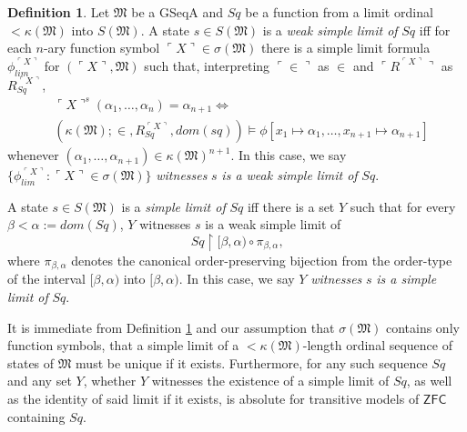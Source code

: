 \documentclass[12pt, twoside]{memoir}
\numberwithin{equation}{section}
\theoremstyle{definition}
\newtheorem{defi}[thm]{Definition}
\theoremstyle{remark}
\theoremstyle{definition}
\theoremstyle{definition}
\theoremstyle{definition}
\theoremstyle{remark}
\begin{document}
\begin{defi}\label{def234}
Let $\mathfrak{M}$ be a GSeqA and $Sq$ be a function from a limit ordinal $< \kappa(\mathfrak{M})$ into $S(\mathfrak{M})$. A state $s \in S(\mathfrak{M})$ is a \emph{weak simple limit of} $Sq$ iff for each $n$-ary function symbol $\ulcorner X \urcorner \in \sigma(\mathfrak{M})$ there is a simple limit formula $\phi_{lim}^{\ulcorner X \urcorner}$ for $(\ulcorner X \urcorner, \mathfrak{M})$ such that, interpreting $\ulcorner \in \urcorner$ as $\in$ and $\ulcorner R^{\ulcorner X \urcorner} \urcorner$ as $R_{Sq}^{\ulcorner X \urcorner}$, 
\begin{align*}
    & \ulcorner X \urcorner^s (\alpha_1, \dots, \alpha_n) = \alpha_{n+1} \iff \\
    & (\kappa(\mathfrak{M}); \in, R_{Sq}^{\ulcorner X \urcorner}, dom(sq)) \models \phi[x_1 \mapsto \alpha_1, \dots, x_{n+1} \mapsto \alpha_{n+1}]
\end{align*}
whenever $(\alpha_1, \dots, \alpha_{n+1}) \in \kappa(\mathfrak{M})^{n+1}$. In this case, we say $\{\phi_{lim}^{\ulcorner X \urcorner} : \ulcorner X \urcorner \in \sigma(\mathfrak{M})\}$ \emph{witnesses} $s$ \emph{is a weak simple limit of} $Sq$.

A state $s \in S(\mathfrak{M})$ is a \emph{simple limit of} $Sq$ iff there is a set $Y$ such that for every $\beta < \alpha := dom(Sq)$, $Y$ witnesses $s$ is a weak simple limit of
\begin{equation*}
    Sq \restriction [\beta, \alpha) \circ \pi_{\beta, \alpha} \text{,}
\end{equation*}
where $\pi_{\beta, \alpha}$ denotes the canonical order-preserving bijection from the order-type of the interval $[\beta, \alpha)$ into $[\beta, \alpha)$. In this case, we say $Y$ \emph{witnesses} $s$ \emph{is a simple limit of} $Sq$.
\end{defi}

It is immediate from Definition \ref{def234} and our assumption that $\sigma(\mathfrak{M})$ contains only function symbols, that a simple limit of a $< \kappa(\mathfrak{M})$-length ordinal sequence of states of $\mathfrak{M}$ must be unique if it exists. Furthermore, for any such sequence $Sq$ and any set $Y$, whether $Y$ witnesses the existence of a simple limit of $Sq$, as well as the identity of said limit if it exists, is absolute for transitive models of $\mathsf{ZFC}$ containing $Sq$.
\end{document}
